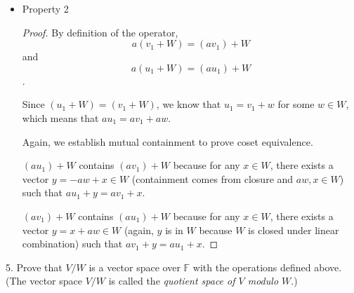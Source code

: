 \documentclass[12pt]{article} %
\newcommand{\F}{\mathbb{F}}
\begin{document}
\begin{flushleft}
\begin{itemize}
\begin{proof}
    So now we want to show that the two right sides are equal.

    $a+W = b+W$ for vectors $a, b\in V$ means that adding each elements of $W$ to $a$ or $b$ generates the same set. Because $0\in W$ as $W$ is a subspace, $b+W$ must contain $a+0=a$ and $a+W$ must contain $b+0 = b$. So we know that $a+w = b$ for some vector $w\in W$ and vice versa, hence $a-b \in W$.

    Now by specification, $v_1 - u_1 \in W$ and $v_2 - u_2 \in W$. Because $W$ is a vector space closed under linear combination, $v_1 - u_1 + v_2 - u_2 \in W$, which means that $v_1 + v_2 = u_1 + u_2 +w$ for some $w\in W$. 
    
    But this means that $(v_1 + v_2) + W = (u_1 + u_2) + W$: $(v_1 + v_2) + W$ is a subset of $(u_1 + u_2) + W$ because for any $x\in W$, $v_1 + v_2 + x = u_1 + u_2 + w + x$, where $(w+x)$ is an element of $W$ by closure. Switching over, $(u_1 + u_2) + W$ is a subset of $(u_1 + u_2) + W$ because for any $x\in W$, $(u_1 + u_2) + x = (v_1 + v_2) - w + x$, and $-w+x$ is an element of $W$ by closure. Mutual containment establishes set equivalence, so the two are equal, proving the first property.
\end{proof}

    \item{Property 2}

    \begin{proof}
        By definition of the operator,
        $$a(v_1 + W) = (av_1) + W$$
        and
        $$a(u_1 + W) = (au_1) + W$$.

        Since $(u_1 + W) = (v_1 + W)$, we know that $u_1 = v_1 + w$ for some $w\in W$, which means that $au_1 = av_1 + aw$.

        Again, we establish mutual containment to prove coset equivalence.

        $(au_1) + W$ contains $(av_1) + W$ because for any $x\in W$, there exists a vector $y = -aw + x\in W$ (containment comes from closure and $aw, x\in W$) such that $au_1 + y = av_1 + x$.

        $(av_1) + W$ contains $(au_1) + W$ because for any $x\in W$, there exists a vector $ y = x+aw\in W$ (again, $y$ is in $W$ because $W$ is closed under linear combination) such that $av_1 + y = au_1 + x$.
    \end{proof}
\end{itemize}

\pagebreak

5.  Prove that $V/W$ is a vector space over $\F$ with the operations defined above.\\
(The vector space $V/W$ is called the \textit{quotient space of $V$ modulo $W$}.)\\


\end{flushleft}
\end{document}
